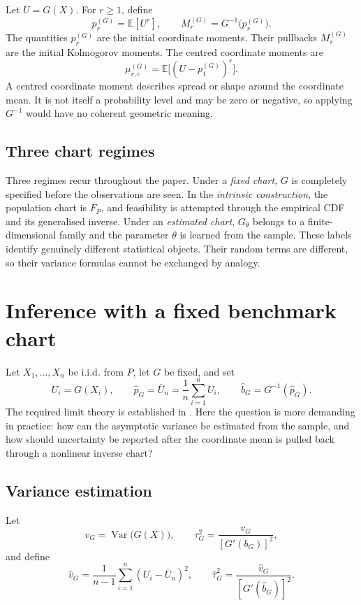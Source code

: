 \documentclass[11pt,a4paper]{article}
\theoremstyle{definition}
\newcommand{\E}{\mathbb{E}}
\newcommand{\Var}{\operatorname{Var}}
\begin{document}
Let $U=G(X)$. For $r\geq1$, define
\[
p_r^{(G)}=\E[U^r],
\qquad
M_r^{(G)}=G^{-1}\!\bigl(p_r^{(G)}\bigr).
\]
The quantities $p_r^{(G)}$ are the initial coordinate moments. Their pullbacks $M_r^{(G)}$ are the initial Kolmogorov moments. The centred coordinate moments are
\[
\mu_{r,c}^{(G)}=\E\bigl[(U-p_1^{(G)})^r\bigr].
\]
A centred coordinate moment describes spread or shape around the coordinate mean. It is not itself a probability level and may be zero or negative, so applying $G^{-1}$ would have no coherent geometric meaning.

\subsection{Three chart regimes}

Three regimes recur throughout the paper. Under a \emph{fixed chart}, $G$ is completely specified before the observations are seen. In the \emph{intrinsic construction}, the population chart is $F_P$, and feasibility is attempted through the empirical CDF and its generalised inverse. Under an \emph{estimated chart}, $G_\theta$ belongs to a finite-dimensional family and the parameter $\theta$ is learned from the sample. These labels identify genuinely different statistical objects. Their random terms are different, so their variance formulas cannot be exchanged by analogy.

\section{Inference with a fixed benchmark chart}\label{sec:fixed}

Let $X_1,\ldots,X_n$ be i.i.d. from $P$, let $G$ be fixed, and set
\[
U_i=G(X_i),\qquad
\widehat p_G=\overline U_n=\frac1n\sum_{i=1}^nU_i,
\qquad
\widehat b_G=G^{-1}(\widehat p_G).
\]
The required limit theory is established in \cite{Cojocea2026}. Here the question is more demanding in practice: how can the asymptotic variance be estimated from the sample, and how should uncertainty be reported after the coordinate mean is pulled back through a nonlinear inverse chart?

\subsection{Variance estimation}

Let
\[
v_G=\Var\bigl(G(X)\bigr),
\qquad
\tau_G^2=\frac{v_G}{[G'(b_G)]^2},
\]
and define
\[
\widehat v_G
=
\frac1{n-1}\sum_{i=1}^n(U_i-\overline U_n)^2,
\qquad
\widehat\tau_G^2
=
\frac{\widehat v_G}{[G'(\widehat b_G)]^2}.
\]
\end{document}
